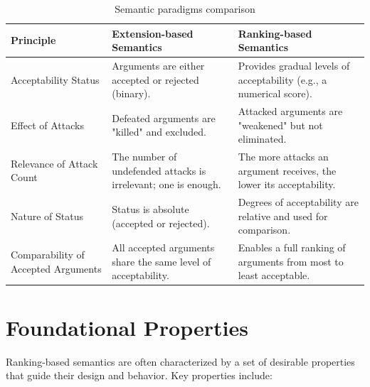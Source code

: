 \documentclass{scrbook}
\begin{document}
\begin{table}
    \centering
    \begin{tabularx}{\textwidth}{|X|X|X|} \hline
        \textbf{Principle} & \textbf{Extension-based Semantics} & \textbf{Ranking-based Semantics} \\ \hline

        Acceptability Status & Arguments are either accepted or rejected (binary). & 
        Provides gradual levels of acceptability (e.g., a numerical score). \\ \hline

        Effect of Attacks & Defeated arguments are "killed" and excluded. & 
        Attacked arguments are "weakened" but not eliminated. \\ \hline

        Relevance of Attack Count & The number of undefended attacks is irrelevant; one is enough. & 
        The more attacks an argument receives, the lower its acceptability. \\ \hline

        Nature of Status & Status is absolute (accepted or rejected). & 
        Degrees of acceptability are relative and used for comparison. \\ \hline

        Comparability of Accepted Arguments & All accepted arguments share the same level of acceptability. & 
        Enables a full ranking of arguments from most to least acceptable. \\ \hline
    \end{tabularx}
    \caption{Semantic paradigms comparison}
\end{table}

\section{Foundational Properties}

Ranking-based semantics are often characterized by a set of desirable properties that guide their design and behavior. Key properties include:
\end{document}
